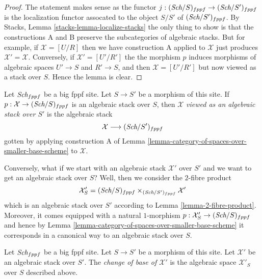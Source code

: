 \begin{proof}
The statement makes sense as the functor
$j : (\textit{Sch}/S)_{fppf} \to (\textit{Sch}/S')_{fppf}$
is the localization functor assocated to the object $S/S'$
of $(\textit{Sch}/S')_{fppf}$. By
Stacks, Lemma \ref{stacks-lemma-localize-stacks}
the only thing to show is that the constructions A and B
preserve the subcategories of algebraic stacks.
But for example, if $\mathcal{X} = [U/R]$ then we have
construction A applied to $\mathcal{X}$ just produces
$\mathcal{X}' = \mathcal{X}$. Conversely, if $\mathcal{X}' = [U'/R']$
the the morphism $p$ induces morphisms of algebraic spaces
$U' \to S$ and $R' \to S$, and then $\mathcal{X} = [U'/R']$
but now viewed as a stack over $S$. Hence the lemma is clear.
\end{proof}

\begin{definition}
\label{definition-viewed-as}
Let $\textit{Sch}_{fppf}$ be a big fppf site.
Let $S \to S'$ be a morphism of this site.
If $p : \mathcal{X} \to (\textit{Sch}/S)_{fppf}$
is an algebraic stack over $S$, then
$\mathcal{X}$ {\it viewed as an algebraic stack over $S'$}
is the algebraic stack
$$
\mathcal{X} \longrightarrow (\textit{Sch}/S')_{fppf}
$$
gotten by applying construction A of
Lemma \ref{lemma-category-of-spaces-over-smaller-base-scheme}
to $\mathcal{X}$.
\end{definition}

\noindent
Conversely, what if we start with an algebraic stack $\mathcal{X}'$
over $S'$ and we want to get an algebraic stack over $S$?
Well, then we consider the $2$-fibre product
$$
\mathcal{X}'_S
=
(\textit{Sch}/S)_{fppf} \times_{(\textit{Sch}/S')_{fppf}} \mathcal{X}'
$$
which is an algebraic stack over $S'$ according to
Lemma \ref{lemma-2-fibre-product}.
Moreover, it comes equipped with a natural $1$-morphism
$p : \mathcal{X}'_S \to (\textit{Sch}/S)_{fppf}$ and hence by
Lemma \ref{lemma-category-of-spaces-over-smaller-base-scheme}
it corresponds in a canonical way to an algebraic stack over $S$.

\begin{definition}
\label{definition-change-of-base}
Let $\textit{Sch}_{fppf}$ be a big fppf site.
Let $S \to S'$ be a morphism of this site.
Let $\mathcal{X}'$ be an algebraic stack over $S'$.
The {\it change of base of $\mathcal{X}'$} is the
algebraic space $\mathcal{X}'_S$ over $S$ described above.
\end{definition}










